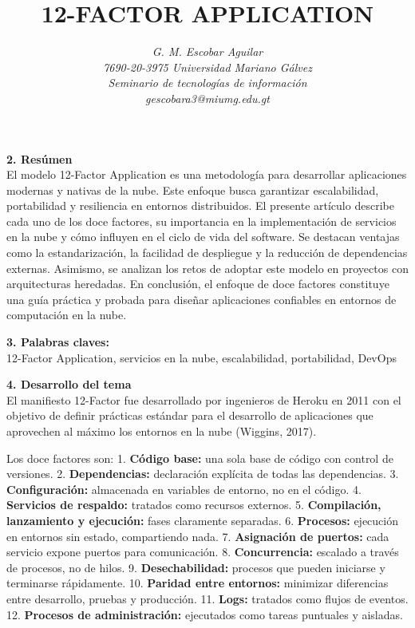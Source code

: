 \documentclass[12pt]{article}
\title{\textbf{\MakeUppercase{12-FACTOR APPLICATION}}}
\author{\textit{G. M. Escobar Aguilar}\\
\textit{7690-20-3975 Universidad Mariano Gálvez}\\
\textit{Seminario de tecnologías de información}\\
\textit{gescobara3@miumg.edu.gt}}
\date{}
\begin{document}
\maketitle

\textbf{2. Resúmen}  
\\
El modelo 12-Factor Application es una metodología para desarrollar aplicaciones modernas y nativas de la nube. Este enfoque busca garantizar escalabilidad, portabilidad y resiliencia en entornos distribuidos. El presente artículo describe cada uno de los doce factores, su importancia en la implementación de servicios en la nube y cómo influyen en el ciclo de vida del software. Se destacan ventajas como la estandarización, la facilidad de despliegue y la reducción de dependencias externas. Asimismo, se analizan los retos de adoptar este modelo en proyectos con arquitecturas heredadas. En conclusión, el enfoque de doce factores constituye una guía práctica y probada para diseñar aplicaciones confiables en entornos de computación en la nube.

\textbf{3. Palabras claves:}  
\\
12-Factor Application, servicios en la nube, escalabilidad, portabilidad, DevOps

\textbf{4. Desarrollo del tema}  
\\
El manifiesto 12-Factor fue desarrollado por ingenieros de Heroku en 2011 con el objetivo de definir prácticas estándar para el desarrollo de aplicaciones que aprovechen al máximo los entornos en la nube (Wiggins, 2017).  

Los doce factores son:  
1. \textbf{Código base:} una sola base de código con control de versiones.  
2. \textbf{Dependencias:} declaración explícita de todas las dependencias.  
3. \textbf{Configuración:} almacenada en variables de entorno, no en el código.  
4. \textbf{Servicios de respaldo:} tratados como recursos externos.  
5. \textbf{Compilación, lanzamiento y ejecución:} fases claramente separadas.  
6. \textbf{Procesos:} ejecución en entornos sin estado, compartiendo nada.  
7. \textbf{Asignación de puertos:} cada servicio expone puertos para comunicación.  
8. \textbf{Concurrencia:} escalado a través de procesos, no de hilos.  
9. \textbf{Desechabilidad:} procesos que pueden iniciarse y terminarse rápidamente.  
10. \textbf{Paridad entre entornos:} minimizar diferencias entre desarrollo, pruebas y producción.  
11. \textbf{Logs:} tratados como flujos de eventos.  
12. \textbf{Procesos de administración:} ejecutados como tareas puntuales y aisladas.  
\end{document}
